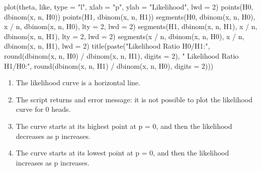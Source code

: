 \documentclass[
  oneside]{book}
\newenvironment{Shaded}{\begin{snugshade}}{\end{snugshade}}
\newcommand{\AttributeTok}[1]{\textcolor[rgb]{0.77,0.63,0.00}{#1}}
\newcommand{\DecValTok}[1]{\textcolor[rgb]{0.00,0.00,0.81}{#1}}
\newcommand{\FunctionTok}[1]{\textcolor[rgb]{0.00,0.00,0.00}{#1}}
\newcommand{\NormalTok}[1]{#1}
\newcommand{\SpecialCharTok}[1]{\textcolor[rgb]{0.00,0.00,0.00}{#1}}
\newcommand{\StringTok}[1]{\textcolor[rgb]{0.31,0.60,0.02}{#1}}
\providecommand{\tightlist}{%
  \setlength{\itemsep}{0pt}\setlength{\parskip}{0pt}}
\begin{document}
\begin{Shaded}
\begin{Highlighting}[]
\FunctionTok{plot}\NormalTok{(theta, like, }\AttributeTok{type =} \StringTok{"l"}\NormalTok{, }\AttributeTok{xlab =} \StringTok{"p"}\NormalTok{, }\AttributeTok{ylab =} \StringTok{"Likelihood"}\NormalTok{, }\AttributeTok{lwd =} \DecValTok{2}\NormalTok{)}
\FunctionTok{points}\NormalTok{(H0, }\FunctionTok{dbinom}\NormalTok{(x, n, H0))}
\FunctionTok{points}\NormalTok{(H1, }\FunctionTok{dbinom}\NormalTok{(x, n, H1))}
\FunctionTok{segments}\NormalTok{(H0, }\FunctionTok{dbinom}\NormalTok{(x, n, H0), x }\SpecialCharTok{/}\NormalTok{ n, }\FunctionTok{dbinom}\NormalTok{(x, n, H0), }\AttributeTok{lty =} \DecValTok{2}\NormalTok{, }\AttributeTok{lwd =} \DecValTok{2}\NormalTok{)}
\FunctionTok{segments}\NormalTok{(H1, }\FunctionTok{dbinom}\NormalTok{(x, n, H1), x }\SpecialCharTok{/}\NormalTok{ n, }\FunctionTok{dbinom}\NormalTok{(x, n, H1), }\AttributeTok{lty =} \DecValTok{2}\NormalTok{, }\AttributeTok{lwd =} \DecValTok{2}\NormalTok{)}
\FunctionTok{segments}\NormalTok{(x }\SpecialCharTok{/}\NormalTok{ n, }\FunctionTok{dbinom}\NormalTok{(x, n, H0), x }\SpecialCharTok{/}\NormalTok{ n, }\FunctionTok{dbinom}\NormalTok{(x, n, H1), }\AttributeTok{lwd =} \DecValTok{2}\NormalTok{)}
\FunctionTok{title}\NormalTok{(}\FunctionTok{paste}\NormalTok{(}\StringTok{"Likelihood Ratio H0/H1:"}\NormalTok{, }\FunctionTok{round}\NormalTok{(}\FunctionTok{dbinom}\NormalTok{(x, n, H0) }\SpecialCharTok{/} \FunctionTok{dbinom}\NormalTok{(x, n, H1), }\AttributeTok{digits =} \DecValTok{2}\NormalTok{), }\StringTok{" Likelihood Ratio H1/H0:"}\NormalTok{, }\FunctionTok{round}\NormalTok{(}\FunctionTok{dbinom}\NormalTok{(x, n, H1) }\SpecialCharTok{/} \FunctionTok{dbinom}\NormalTok{(x, n, H0), }\AttributeTok{digits =} \DecValTok{2}\NormalTok{)))}
\end{Highlighting}
\end{Shaded}

\begin{enumerate}
\def\labelenumi{\Alph{enumi})}
\tightlist
\item
  The likelihood curve is a horizontal line.
\item
  The script returns and error message: it is not possible to plot the likelihood curve for 0 heads.
\item
  The curve starts at its highest point at p = 0, and then the likelihood decreases as p increases.
\item
  The curve starts at its lowest point at p = 0, and then the likelihood increases as p increases.
\end{enumerate}
\end{document}
